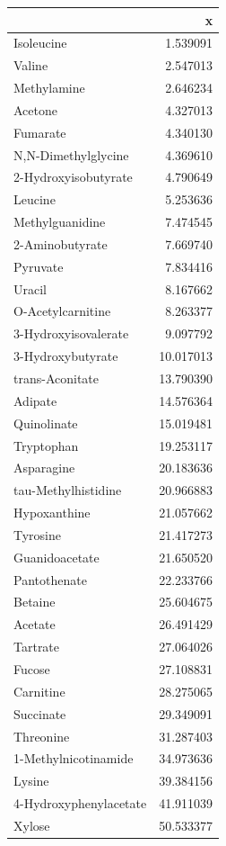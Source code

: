 \documentclass[
]{article}
\begin{document}
\begin{longtable}[]{@{}lr@{}}
\toprule\noalign{}
& x \\
\midrule\noalign{}
\endhead
\bottomrule\noalign{}
\endlastfoot
Isoleucine & 1.539091 \\
Valine & 2.547013 \\
Methylamine & 2.646234 \\
Acetone & 4.327013 \\
Fumarate & 4.340130 \\
N,N-Dimethylglycine & 4.369610 \\
2-Hydroxyisobutyrate & 4.790649 \\
Leucine & 5.253636 \\
Methylguanidine & 7.474545 \\
2-Aminobutyrate & 7.669740 \\
Pyruvate & 7.834416 \\
Uracil & 8.167662 \\
O-Acetylcarnitine & 8.263377 \\
3-Hydroxyisovalerate & 9.097792 \\
3-Hydroxybutyrate & 10.017013 \\
trans-Aconitate & 13.790390 \\
Adipate & 14.576364 \\
Quinolinate & 15.019481 \\
Tryptophan & 19.253117 \\
Asparagine & 20.183636 \\
tau-Methylhistidine & 20.966883 \\
Hypoxanthine & 21.057662 \\
Tyrosine & 21.417273 \\
Guanidoacetate & 21.650520 \\
Pantothenate & 22.233766 \\
Betaine & 25.604675 \\
Acetate & 26.491429 \\
Tartrate & 27.064026 \\
Fucose & 27.108831 \\
Carnitine & 28.275065 \\
Succinate & 29.349091 \\
Threonine & 31.287403 \\
1-Methylnicotinamide & 34.973636 \\
Lysine & 39.384156 \\
4-Hydroxyphenylacetate & 41.911039 \\
Xylose & 50.533377 \\

\end{longtable}
\end{document}
